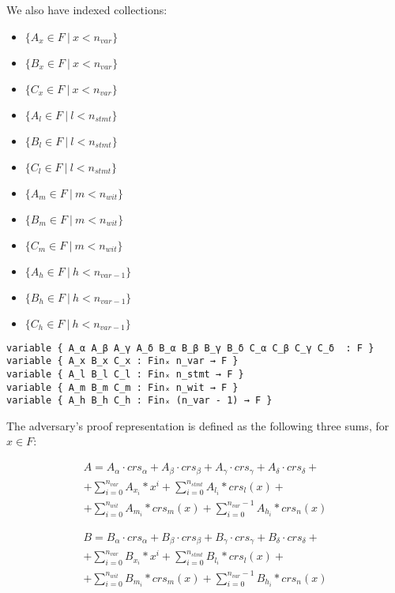 \documentclass{article}
\theoremstyle{definition}
\theoremstyle{remark}
\begin{document}
We also have indexed collections:
\begin{itemize}
\item $\{ A_x \in F \: | \: x < n_{var} \}$
\item $\{ B_x \in F \: | \: x < n_{var} \}$
\item $\{ C_x \in F \: | \: x < n_{var} \}$
\item $\{ A_l \in F \: | \: l < n_{stmt} \}$
\item $\{ B_l \in F \: | \: l < n_{stmt} \}$
\item $\{ C_l \in F \: | \: l < n_{stmt} \}$
\item $\{ A_m \in F \: | \: m < n_{wit} \}$
\item $\{ B_m \in F \: | \: m < n_{wit} \}$
\item $\{ C_m \in F \: | \: m < n_{wit} \}$
\item $\{ A_h \in F \: | \: h < n_{var - 1} \}$
\item $\{ B_h \in F \: | \: h < n_{var - 1} \}$
\item $\{ C_h \in F \: | \: h < n_{var - 1} \}$
\end{itemize}

\begin{lstlisting}
variable { A_α A_β A_γ A_δ B_α B_β B_γ B_δ C_α C_β C_γ C_δ  : F }
variable { A_x B_x C_x : Finₓ n_var → F }
variable { A_l B_l C_l : Finₓ n_stmt → F }
variable { A_m B_m C_m : Finₓ n_wit → F }
variable { A_h B_h C_h : Finₓ (n_var - 1) → F }
\end{lstlisting}

The adversary's proof representation is defined as the following three sums, for $x \in F$:

\begin{multline}
A = A_{\alpha} \cdot crs_{\alpha} + A_{\beta} \cdot crs_{\beta} + A_{\gamma} \cdot crs_{\gamma} + A_{\delta} \cdot crs_{\delta} + \\
    + \sum \limits_{i = 0}^{n_{var}} A_{x_i} * x^i + \sum \limits_{i = 0}^{n_{stmt}} A_{l_i} * crs_l(x) + \\
    + \sum \limits_{i = 0}^{n_{wit}} A_{m_i} * crs_m(x) + \sum \limits_{i = 0}^{n_{var} - 1} A_{h_i} * crs_n(x)
\end{multline}

\begin{multline}
B = B_{\alpha} \cdot crs_{\alpha} + B_{\beta} \cdot crs_{\beta} + B_{\gamma} \cdot crs_{\gamma} + B_{\delta} \cdot crs_{\delta} + \\
    + \sum \limits_{i = 0}^{n_{var}} B_{x_i} * x^i + \sum \limits_{i = 0}^{n_{stmt}} B_{l_i} * crs_l(x) + \\
    + \sum \limits_{i = 0}^{n_{wit}} B_{m_i} * crs_m(x) + \sum \limits_{i = 0}^{n_{var} - 1} B_{h_i} * crs_n(x)
\end{multline}
\end{document}
